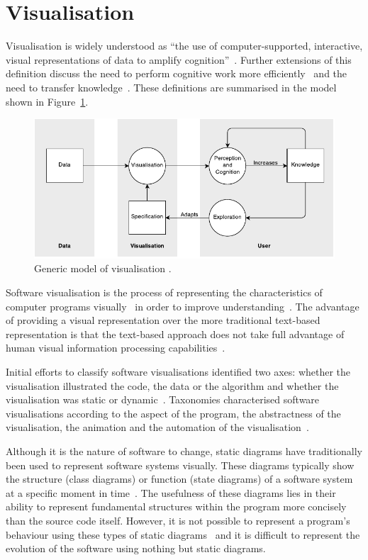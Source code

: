 \section{Visualisation}

Visualisation is widely understood as ``the use of computer-supported, interactive, visual representations of data to amplify cognition''~\cite{Card1999}. Further extensions of this definition discuss the need to perform cognitive work more efficiently~\cite{Ware2013a} and the need to transfer knowledge~\cite{Burkhard}. These definitions are summarised in the model shown in Figure~\ref{fig:model-of-visualisation}.

\begin{figure}
  \centering \includegraphics[width=\columnwidth]{../images/diagrams/wijk-model-of-visualisation.pdf}
  \caption[Generic model of visualisation]{Generic model of visualisation \protect\cite{VanWijk2005}.}
\label{fig:model-of-visualisation}
\end{figure}

Software visualisation is the process of representing the characteristics of computer programs visually~\cite{Stasko1992} in order to improve understanding~\cite{Diehl2007}. The advantage of providing a visual representation over the more traditional text-based representation is that the text-based approach does not take full advantage of human visual information processing capabilities~\cite{Myers1989}.

Initial efforts to classify software visualisations identified two axes: whether the visualisation illustrated the code, the data or the algorithm and whether the visualisation was static or dynamic~\cite{Myers1989}. Taxonomies characterised software visualisations according to the aspect of the program, the abstractness of the visualisation, the animation and the automation of the visualisation~\cite{Stasko1992}.

Although it is the nature of software to change, static diagrams have traditionally been used to represent software systems visually. These diagrams typically show the structure (class diagrams) or function (state diagrams) of a software system at a specific moment in time~\cite{Rumbaugh2004}. The usefulness of these diagrams lies in their ability to represent fundamental structures within the program more concisely than the source code itself. However, it is not possible to represent a program's behaviour using these types of static diagrams~\cite{Baecker1998} and it is difficult to represent the evolution of the software using nothing but static diagrams.

